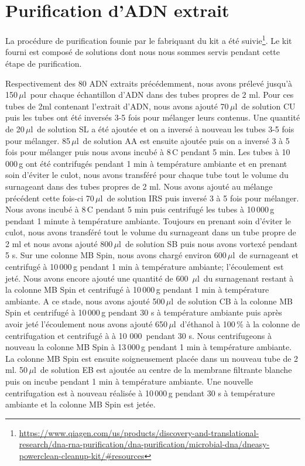 \documentclass[a4paper,11pt]{article}
\begin{document}
\section{Purification d'ADN extrait}

La procédure de purification founie par le fabriquant du kit a été
suivie\footnote{\url{https://www.qiagen.com/us/products/discovery-and-translational-research/dna-rna-purification/dna-purification/microbial-dna/dneasy-powerclean-cleanup-kit/#resources}}.
Le kit fourni est composé de solutions dont nous nous sommes servis
pendant cette étape de purification.

Respectivement des 80 ADN extraits précédemment, nous avons prélevé
jusqu'à 150\,$\mu$l\, pour chaque échantillon d'ADN dans des tubes
propres de 2 ml. Pour ces tubes de 2ml contenant l'extrait d'ADN, nous
avons ajouté 70\,$\mu$l\, de solution CU puis les tubes ont été
inversés 3-5 fois pour mélanger leurs contenus. Une quantité de
20\,$\mu$l\, de solution SL a été ajoutée et on a inversé à nouveau
les tubes 3-5 fois pour mélanger.  85\,$\mu$l\, de solution AA est
ensuite ajoutée puis on a inversé 3 à 5 fois pour mélanger puis nous
avons incubé à 8\,\degree{}C pendant 5 min. Les tubes à 10\,000\,g ont
été contrifugés pendant 1 min à température ambiante et en prenant
soin d'éviter le culot, nous avons transféré pour chaque tube tout le
volume du surnageant dans des tubes propres de 2 ml. Nous avons ajouté
au mélange précédent cette fois-ci 70\,$\mu$l\, de solution IRS puis
inversé 3 à 5 fois pour mélanger. Nous avons incubé à 8\,\degree{}C
pendant 5 min puis centrifugé les tubes à 10\,000\,g pendant 1 minute
à température ambiante. Toujours en prenant soin d'éviter le culot,
nous avons transféré tout le volume du surnageant dans un tube propre
de 2 ml et nous avons ajouté 800\,$\mu$l\, de solution SB puis nous
avons vortexé pendant 5 s. Sur une colonne MB Spin, nous avons chargé
environ 600\,$\mu$l\, de surnageant et centrifugé à 10\,000\,g pendant
1 min à température ambiante; l'écoulement est jeté. Nous avons encore
ajouté une quantité de 600 \,$\mu$l\, du surnagenant restant à la
colonne MB Spin et centrifugé à 10\,000\,g pendant 1 min à température
ambiante.  A ce stade, nous avons ajouté 500\,$\mu$l\, de solution CB
à la colonne MB Spin et centrifugé à 10\,000\,g pendant 30 s à
température ambiante puis après avoir jeté l'écoulement nous avons
ajouté 650\,$\mu$l\, d'éthanol à 100\,\% à la colonne de
centrifugation et centrifugé à à 10 000\, pendant 30 s. Nous
centrifugeons à nouveau la colonne MB Spin à 13\,000\,g pendant 1 min
à température ambiante.  La colonne MB Spin est ensuite soigneusement
placée dans un nouveau tube de 2 ml. 50\,$\mu$l\, de solution EB est
ajoutée au centre de la membrane filtrante blanche puis on incube
pendant 1 min à température ambiante. Une nouvelle centrifugation est
à nouveau réalisée à 10\,000\,g pendant 30 s à température ambiante et
la colonne MB Spin est jetée.
\end{document}
